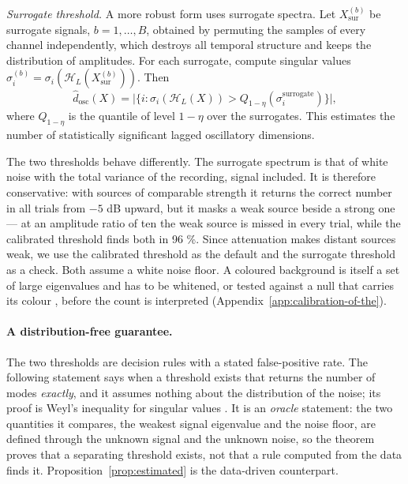 \documentclass{article}
\begin{document}
\emph{Surrogate threshold.} A more robust form uses surrogate spectra. Let $X_{\mathrm{sur}}^{(b)}$ be surrogate signals, $b = 1, \dots, B$, obtained by permuting the samples of every channel independently, which destroys all temporal structure and keeps the distribution of amplitudes. For each surrogate, compute singular values $\sigma_i^{(b)} = \sigma_i(\mathcal{H}_L(X_{\mathrm{sur}}^{(b)}))$. Then \[
\widehat{d}_{\mathrm{osc}}(X) = \bigl|\{ i : \sigma_i(\mathcal{H}_L(X)) > Q_{1-\eta}(\sigma_i^{\mathrm{surrogate}}) \}\bigr| ,
\] where $Q_{1-\eta}$ is the quantile of level $1 - \eta$ over the surrogates. This estimates the number of statistically significant lagged oscillatory dimensions.

The two thresholds behave differently. The surrogate spectrum is that of white noise with the total variance of the recording, signal included. It is therefore conservative: with sources of comparable strength it returns the correct number in all trials from $-5$ dB upward, but it masks a weak source beside a strong one --- at an amplitude ratio of ten the weak source is missed in every trial, while the calibrated threshold finds both in 96 \%. Since attenuation makes distant sources weak, we use the calibrated threshold as the default and the surrogate threshold as a check. Both assume a white noise floor. A coloured background is itself a set of large eigenvalues and has to be whitened, or tested against a null that carries its colour \cite{ref-Allen}, before the count is interpreted (Appendix~\ref{app:calibration-of-the}).

\paragraph{A distribution-free guarantee.} The two thresholds are decision rules with a stated false-positive rate. The following statement says when a threshold exists that returns the number of modes \emph{exactly}, and it assumes nothing about the distribution of the noise; its proof is Weyl's inequality for singular values \cite{ref-Weyl}. It is an \emph{oracle} statement: the two quantities it compares, the weakest signal eigenvalue and the noise floor, are defined through the unknown signal and the unknown noise, so the theorem proves that a separating threshold exists, not that a rule computed from the data finds it. Proposition~\ref{prop:estimated} is the data-driven counterpart.
\end{document}
